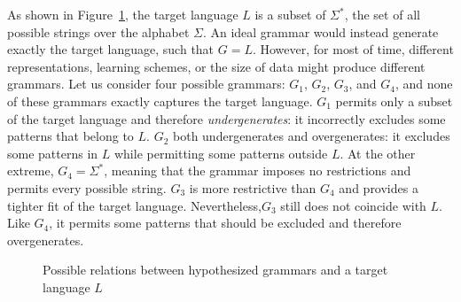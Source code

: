 As shown in Figure~\ref{fig:Grammarvenn}, the target language \(L\) is a subset 
of \(\Sigma^*\), the set of all possible strings over the alphabet \(\Sigma\). 
An ideal grammar would instead generate exactly the target language, such that \(G=L\). However, for most of time, different representations, learning schemes, 
or the size of data might produce different grammars. Let us consider
four possible grammars: \(G_1\), \(G_2\), \(G_3\), and \(G_4\), and none of these grammars exactly captures the target language. \(G_1\) permits only a subset of the target language and therefore \textit
{undergenerates}: it incorrectly excludes some patterns that belong to \(L\). \(G_2\) both undergenerates and overgenerates: it excludes some patterns in \(L\) while permitting some patterns outside \(L\). At the other extreme, \(G_4=\Sigma^*\), meaning that the grammar imposes no 
restrictions and permits every possible string. \(G_3\) is more restrictive 
than \(G_4\) and provides a tighter fit of the target language. Nevertheless,\(G_3\) 
still does not coincide with \(L\). Like \(G_4\), it permits some 
patterns that should be excluded and therefore overgenerates.
\begin{figure}[ht]
    \centering
\caption{Possible relations between hypothesized grammars and a target language $L$}
\label{fig:Grammarvenn}
\end{figure}

